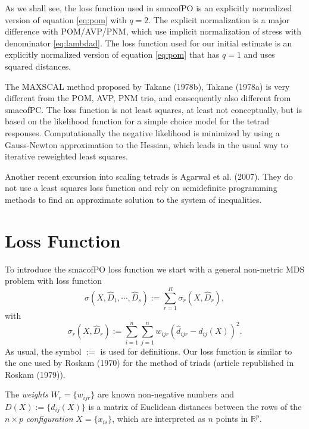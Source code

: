 \documentclass[
  12pt,
]{article}
\begin{document}
As we shall see, the loss function used in smacofPO is an explicitly normalized version of equation \eqref{eq:pom} with \(q=2\). The explicit normalization is a major difference with POM/AVP/PNM, which use implicit normalization of stress with denominator \eqref{eq:lambdad}. The loss function used for our initial estimate is an explicitly normalized version of equation \eqref{eq:pom} that has \(q=1\) and uses squared distances.

The MAXSCAL method proposed by Takane (1978b), Takane (1978a) is very different from the POM, AVP, PNM trio, and consequently also different from smacofPC. The loss function is not
least squares, at least not conceptually, but is based on the likelihood function for a simple choice model for the tetrad responses. Computationally the negative likelihood is minimized by using a Gauss-Newton approximation to the Hessian, which leads in the usual way to iterative reweighted least squares.

Another recent excursion into scaling tetrads is Agarwal et al. (2007). They do not use
a least squares loss function and rely on semidefinite programming methods
to find an approximate solution to the system of inequalities.

\section{Loss Function}\label{loss-function}

To introduce the smacofPO loss function we start with a general non-metric MDS problem with
loss function
\begin{equation}
\sigma(X,\hat D_1,\cdots,\hat D_s):=\sum_{r=1}^R\sigma_r(X,\hat D_r),
\label{eq:stressdef}
\end{equation}
with
\begin{equation}
\sigma_r(X,\hat D_r):=\sum_{i=1}^n\sum_{j=1}^n w_{ijr}(\hat d_{ijr}-d_{ij}(X))^2.
\label{eq:rstressdef}
\end{equation}
As usual, the symbol \(:=\) is used for definitions. Our loss function is
similar to the one used by Roskam (1970) for the method of triads (article republished in Roskam (1979)).

The \emph{weights} \(W_r=\{w_{ijr}\}\) are known non-negative
numbers and \(D(X):=\{d_{ij}(X)\}\) is a matrix of Euclidean distances
between the rows of the \(n\times p\) \emph{configuration} \(X=\{x_{is}\}\), which are interpreted as \(n\) points in \(\mathbb{R}^p\).
\end{document}
